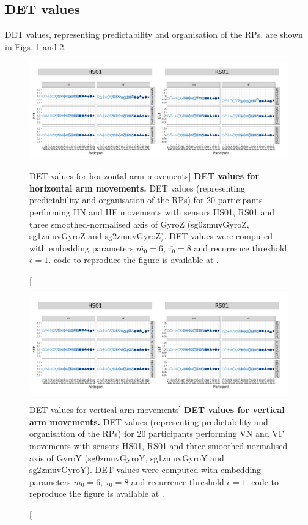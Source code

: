 \newpage
\subsection{DET values}
DET values, representing predictability and organisation of the RPs.
are shown in Figs. \ref{fig:det_aH} and \ref{fig:det_aV}.


\begin{figure}
\centering
\includegraphics[width=1.0\textwidth]{det_aH}
    \caption
	[DET values for horizontal arm movements]{
	{\bf DET values for horizontal arm movements.}	
    	DET values (representing predictability and organisation of the RPs)
	for 20 participants performing HN and HF movements
	with sensors HS01, RS01 and three smoothed-normalised axis 
	of GyroZ (sg0zmuvGyroZ, sg1zmuvGyroZ and sg2zmuvGyroZ).
	DET values were computed with 
	embedding parameters $\overline{m_0}=6$, $\overline{\tau_0}=8$ and
	recurrence threshold $\epsilon=1$.
	\R code to reproduce the figure is available at 
	.
        }
    \label{fig:det_aH}
\end{figure}
\begin{figure}
\centering
\includegraphics[width=1.0\textwidth]{det_aV}
    \caption
	[DET values for vertical arm movements]{
	{\bf DET values for vertical arm movements.}	
    	DET values (representing predictability and organisation of the RPs) 
	for 20 participants performing VN and VF movements
	with sensors HS01, RS01 and three smoothed-normalised axis 
	of GyroY (sg0zmuvGyroY, sg1zmuvGyroY and sg2zmuvGyroY).
	DET values were computed with 
	embedding parameters $\overline{m_0}=6$, $\overline{\tau_0}=8$ and
	recurrence threshold $\epsilon=1$.
	\R code to reproduce the figure is available at 
	.
        }
    \label{fig:det_aV}
\end{figure}
